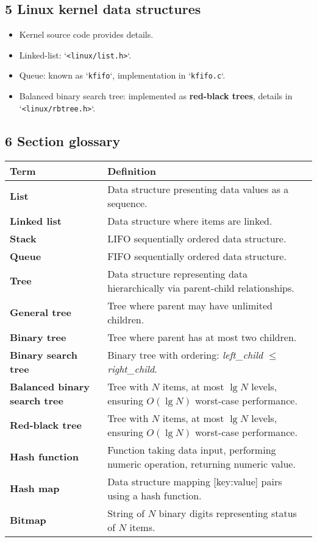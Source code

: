 \documentclass{article}
\begin{document}
\subsection*{5 Linux kernel data structures}
\begin{itemize}
    \item Kernel source code provides details.
    \item Linked-list: `\texttt{<linux/list.h>}`.
    \item Queue: known as `\texttt{kfifo}`, implementation in `\texttt{kfifo.c}`.
    \item Balanced binary search tree: implemented as \textbf{red-black trees}, details in `\texttt{<linux/rbtree.h>}`.
\end{itemize}

\subsection*{6 Section glossary}
\centering
\begin{tabular}{>{\raggedright}p{} >{\raggedright\arraybackslash}p{}}
\toprule
\textbf{Term} & \textbf{Definition} \\
\midrule
\textbf{List} & Data structure presenting data values as a sequence. \\
\textbf{Linked list} & Data structure where items are linked. \\
\textbf{Stack} & LIFO sequentially ordered data structure. \\
\textbf{Queue} & FIFO sequentially ordered data structure. \\
\textbf{Tree} & Data structure representing data hierarchically via parent-child relationships. \\
\textbf{General tree} & Tree where parent may have unlimited children. \\
\textbf{Binary tree} & Tree where parent has at most two children. \\
\textbf{Binary search tree} & Binary tree with ordering: \textit{left\_child} $\le$ \textit{right\_child}. \\
\textbf{Balanced binary search tree} & Tree with $N$ items, at most $\lg N$ levels, ensuring $O(\lg N)$ worst-case performance. \\
\textbf{Red-black tree} & Tree with $N$ items, at most $\lg N$ levels, ensuring $O(\lg N)$ worst-case performance. \\
\textbf{Hash function} & Function taking data input, performing numeric operation, returning numeric value. \\
\textbf{Hash map} & Data structure mapping [key:value] pairs using a hash function. \\
\textbf{Bitmap} & String of $N$ binary digits representing status of $N$ items. \\
\bottomrule
\end{tabular}
\vspace{\baselineskip}
\newpage
\end{document}
